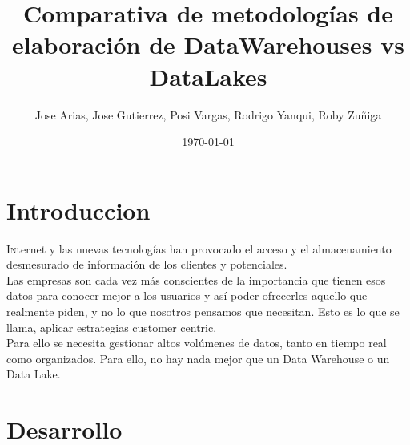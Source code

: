 \documentclass[twoside,twocolumn]{article}
\title{Comparativa de metodologías de elaboración de DataWarehouses vs DataLakes}
\author{Jose Arias, Jose Gutierrez, Posi Vargas, Rodrigo Yanqui, Roby Zuñiga}
\date{\today}
\begin{document}
\maketitle


\section{Introduccion}
\lettrine[nindent=0em,lines=3]{I}nternet y las nuevas tecnologías han provocado el acceso y el almacenamiento desmesurado de información de los clientes y potenciales.\\[0.1in]
Las empresas son cada vez más conscientes de la importancia que tienen esos datos para conocer mejor a los usuarios y así poder ofrecerles aquello que realmente piden, y no lo que nosotros pensamos que necesitan. Esto es lo que se llama, aplicar estrategias customer centric.\\[0.1in]
Para ello se necesita gestionar altos volúmenes de datos, tanto en tiempo real como organizados. Para ello, no hay nada mejor que un Data Warehouse o un Data Lake.


\section{Desarrollo}
\end{document}
